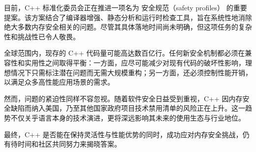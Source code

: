 
目前，C++ 标准化委员会正在推进一项名为 安全规范（safety profiles） 的重要提案。该方案结合了编译器增强、静态分析和运行时检查工具，旨在系统性地消除绝大多数内存安全相关的问题。尽管其具体落地时间尚未明确，但这项任务的复杂性和挑战性已令人敬畏。

全球范围内，现存的 C++ 代码量可能高达数百亿行。任何新安全机制都必须在兼容性和实用性之间取得平衡：一方面，应尽可能减少对现有代码的破坏性影响，理想情况下只需标注潜在问题而无需大规模重构；另一方面，还必须控制性能开销，以满足众多高性能应用场景的需求。

然而，问题的紧迫性同样不容忽视。随着软件安全日益受到重视，C++ 因内存安全缺陷而纳入美国，乃至其他国家政府项目技术禁用清单的风险正在上升。这一趋势不仅关乎语言本身的技术演进，更将深远影响其未来的使用生态与行业地位。

最终，C++ 是否能在保持灵活性与性能优势的同时，成功应对内存安全挑战，仍有待时间和社区共同努力来揭晓答案。
